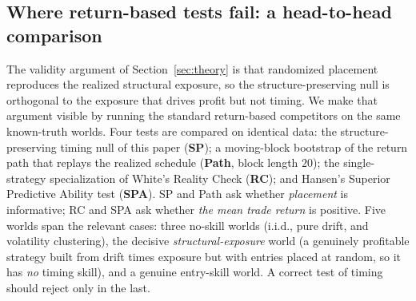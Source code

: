 \subsection{Where return-based tests fail: a head-to-head comparison}
\label{sec:competitor}

The validity argument of Section~\ref{sec:theory} is that randomized placement reproduces the realized structural exposure, so the structure-preserving null is orthogonal to the exposure that drives profit but not timing. We make that argument visible by running the standard return-based competitors on the same known-truth worlds. Four tests are compared on identical data: the structure-preserving timing null of this paper (\textbf{SP}); a moving-block bootstrap of the return path that replays the realized schedule (\textbf{Path}, block length $20$); the single-strategy specialization of White's Reality Check \cite{white2000} (\textbf{RC}); and Hansen's Superior Predictive Ability test \cite{hansen2005} (\textbf{SPA}). SP and Path ask whether \emph{placement} is informative; RC and SPA ask whether \emph{the mean trade return} is positive. Five worlds span the relevant cases: three no-skill worlds (i.i.d., pure drift, and volatility clustering), the decisive \emph{structural-exposure} world (a genuinely profitable strategy built from drift times exposure but with entries placed at random, so it has \emph{no} timing skill), and a genuine entry-skill world. A correct test of timing should reject only in the last.

